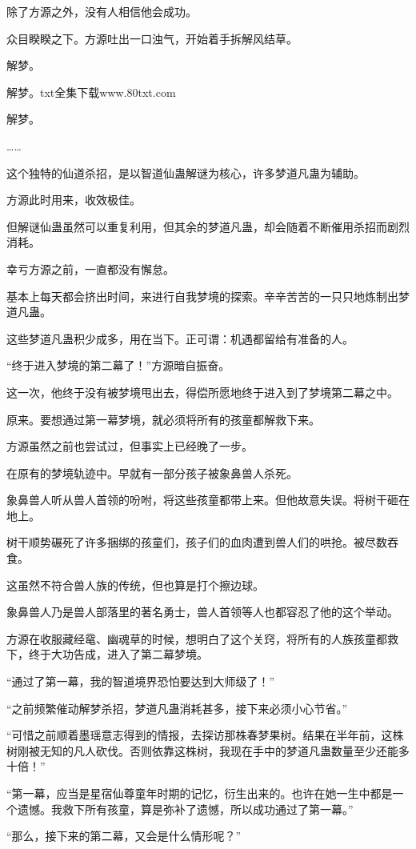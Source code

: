 \begin{this_body}
除了方源之外，没有人相信他会成功。

众目睽睽之下。方源吐出一口浊气，开始着手拆解风结草。

解梦。

解梦。txt全集下载www.80txt.com

解梦。

……

这个独特的仙道杀招，是以智道仙蛊解谜为核心，许多梦道凡蛊为辅助。

方源此时用来，收效极佳。

但解谜仙蛊虽然可以重复利用，但其余的梦道凡蛊，却会随着不断催用杀招而剧烈消耗。

幸亏方源之前，一直都没有懈怠。

基本上每天都会挤出时间，来进行自我梦境的探索。辛辛苦苦的一只只地炼制出梦道凡蛊。

这些梦道凡蛊积少成多，用在当下。正可谓：机遇都留给有准备的人。

“终于进入梦境的第二幕了！”方源暗自振奋。

这一次，他终于没有被梦境甩出去，得偿所愿地终于进入到了梦境第二幕之中。

原来。要想通过第一幕梦境，就必须将所有的孩童都解救下来。

方源虽然之前也尝试过，但事实上已经晚了一步。

在原有的梦境轨迹中。早就有一部分孩子被象鼻兽人杀死。

象鼻兽人听从兽人首领的吩咐，将这些孩童都带上来。但他故意失误。将树干砸在地上。

树干顺势碾死了许多捆绑的孩童们，孩子们的血肉遭到兽人们的哄抢。被尽数吞食。

这虽然不符合兽人族的传统，但也算是打个擦边球。

象鼻兽人乃是兽人部落里的著名勇士，兽人首领等人也都容忍了他的这个举动。

方源在收服藏经鼋、幽魂草的时候，想明白了这个关窍，将所有的人族孩童都救下，终于大功告成，进入了第二幕梦境。

“通过了第一幕，我的智道境界恐怕要达到大师级了！”

“之前频繁催动解梦杀招，梦道凡蛊消耗甚多，接下来必须小心节省。”

“可惜之前顺着墨瑶意志得到的情报，去探访那株春梦果树。结果在半年前，这株树刚被无知的凡人砍伐。否则依靠这株树，我现在手中的梦道凡蛊数量至少还能多十倍！”

“第一幕，应当是星宿仙尊童年时期的记忆，衍生出来的。也许在她一生中都是一个遗憾。我救下所有孩童，算是弥补了遗憾，所以成功通过了第一幕。”

“那么，接下来的第二幕，又会是什么情形呢？”


\end{this_body}
